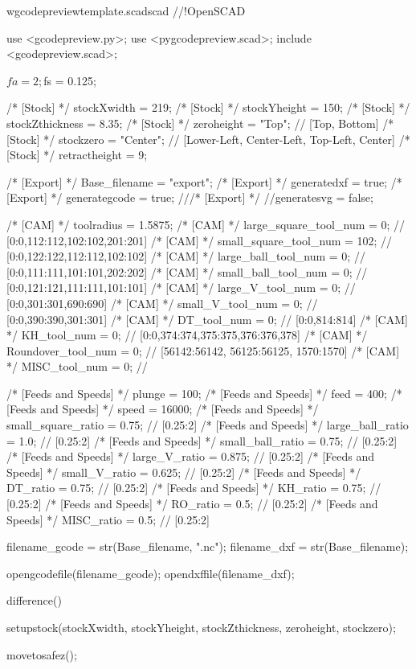 \documentclass{ltxdoc}
\begin{document}
\begin{writecode}{w}{gcodepreviewtemplate.scad}{scad}
//!OpenSCAD

use <gcodepreview.py>;
use <pygcodepreview.scad>;
include <gcodepreview.scad>;

$fa = 2;
$fs = 0.125;

/* [Stock] */
stockXwidth = 219;
/* [Stock] */
stockYheight = 150;
/* [Stock] */
stockZthickness = 8.35;
/* [Stock] */
zeroheight = "Top"; // [Top, Bottom]
/* [Stock] */
stockzero = "Center"; // [Lower-Left, Center-Left, Top-Left, Center]
/* [Stock] */
retractheight = 9;

/* [Export] */
Base_filename = "export"; 
/* [Export] */
generatedxf = true; 
/* [Export] */
generategcode = true; 
///* [Export] */
//generatesvg = false; 

/* [CAM] */
toolradius = 1.5875;
/* [CAM] */
large_square_tool_num = 0; // [0:0,112:112,102:102,201:201]
/* [CAM] */
small_square_tool_num = 102; // [0:0,122:122,112:112,102:102]
/* [CAM] */
large_ball_tool_num = 0; // [0:0,111:111,101:101,202:202]
/* [CAM] */
small_ball_tool_num = 0; // [0:0,121:121,111:111,101:101]
/* [CAM] */
large_V_tool_num = 0; // [0:0,301:301,690:690]
/* [CAM] */
small_V_tool_num = 0; // [0:0,390:390,301:301]
/* [CAM] */
DT_tool_num = 0; // [0:0,814:814]
/* [CAM] */
KH_tool_num = 0; // [0:0,374:374,375:375,376:376,378]
/* [CAM] */
Roundover_tool_num = 0; // [56142:56142, 56125:56125, 1570:1570]
/* [CAM] */
MISC_tool_num = 0; // 

/* [Feeds and Speeds] */
plunge = 100;
/* [Feeds and Speeds] */
feed = 400;
/* [Feeds and Speeds] */
speed = 16000;
/* [Feeds and Speeds] */
small_square_ratio = 0.75; // [0.25:2]
/* [Feeds and Speeds] */
large_ball_ratio = 1.0; // [0.25:2]
/* [Feeds and Speeds] */
small_ball_ratio = 0.75; // [0.25:2]
/* [Feeds and Speeds] */
large_V_ratio = 0.875; // [0.25:2]
/* [Feeds and Speeds] */
small_V_ratio = 0.625; // [0.25:2]
/* [Feeds and Speeds] */
DT_ratio = 0.75; // [0.25:2]
/* [Feeds and Speeds] */
KH_ratio = 0.75; // [0.25:2]
/* [Feeds and Speeds] */
RO_ratio = 0.5; // [0.25:2]
/* [Feeds and Speeds] */
MISC_ratio = 0.5; // [0.25:2]

filename_gcode = str(Base_filename, ".nc");
filename_dxf = str(Base_filename);

opengcodefile(filename_gcode);
opendxffile(filename_dxf);

difference() {
setupstock(stockXwidth, stockYheight, stockZthickness, zeroheight, stockzero);

movetosafez();

}
\end{writecode}
\end{document}

